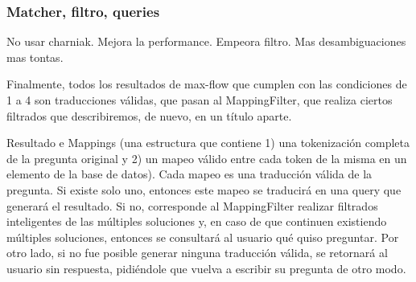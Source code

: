 \begin{frame}
\frametitle{Matcher, filtro, queries}
 No usar charniak. Mejora la performance. Empeora filtro. Mas desambiguaciones mas tontas.

Finalmente, todos los resultados de max-flow que cumplen con las condiciones de 1 a  4 son traducciones válidas, que pasan al MappingFilter, que realiza ciertos filtrados que describiremos, de nuevo, en un título aparte.

Resultado e Mappings (una estructura que contiene 1) una tokenización completa de la pregunta original y 2) un mapeo válido entre cada token de la misma en un elemento de la base de datos). 
Cada mapeo es una traducción válida de la pregunta. Si existe solo uno, entonces este mapeo se traducirá en una query que generará el resultado. Si no, corresponde al MappingFilter realizar filtrados inteligentes de las múltiples soluciones y, en caso de que continuen existiendo múltiples soluciones, entonces se consultará al usuario qué quiso preguntar. Por otro lado, si no fue posible generar ninguna traducción válida, se retornará al usuario sin respuesta, pidiéndole que vuelva a escribir su pregunta de otro modo.


\end{frame}


